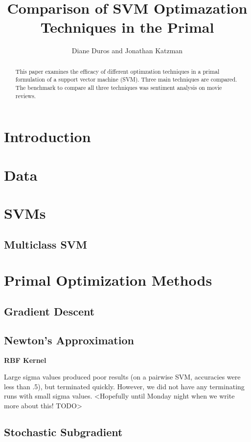 \documentclass[letterpaper, 11pt]{article}
\begin{document}
\title{Comparison of SVM Optimazation Techniques in the Primal}
\author{Diane Duros and Jonathan Katzman}
\maketitle
\begin{abstract}This paper examines the efficacy of different optimzation techniques in a primal formulation of a support vector machine (SVM).  Three main techniques are compared.  The benchmark to compare all three techniques was sentiment analysis on movie reviews.
\end{abstract}
                                                                                                                                                                                                                                                                           
\section{Introduction}


\section{Data}

\section{SVMs}

\subsection{Multiclass SVM}

\section{Primal Optimization Methods}

\subsection{Gradient Descent}

\subsection{Newton's Approximation}

\textbf{RBF Kernel}

Large sigma values produced poor results (on a pairwise SVM, accuracies were less than .5), but terminated quickly.  However, we did not have any terminating runs with small sigma values. <Hopefully until Monday night when we write more about this! TODO>


\subsection{Stochastic Subgradient}


\nocite{*}
 

\end{document}
